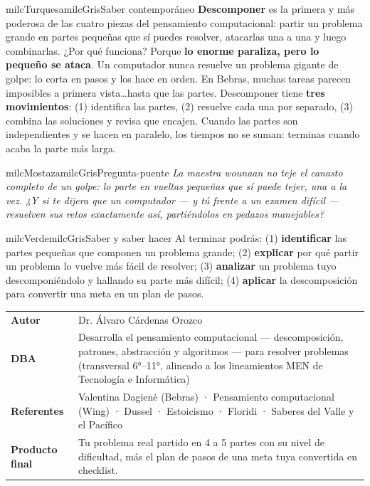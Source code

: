 \documentclass[11pt,letterpaper]{article}
\begin{document}
\begin{softbox}{milcTurquesa}{milcGris}{Saber contemporáneo}
\textbf{Descomponer} es la primera y más poderosa de las cuatro piezas del pensamiento computacional: partir un problema grande en partes pequeñas que sí puedes resolver, atacarlas una a una y luego combinarlas. ¿Por qué funciona? Porque \textbf{lo enorme paraliza, pero lo pequeño se ataca}. Un computador nunca resuelve un problema gigante de golpe: lo corta en pasos y los hace en orden. En Bebras, muchas tareas parecen imposibles a primera vista\ldots hasta que las partes. Descomponer tiene \textbf{tres movimientos}: (1) identifica las partes, (2) resuelve cada una por separado, (3) combina las soluciones y revisa que encajen. Cuando las partes son independientes y se hacen en paralelo, los tiempos no se suman: terminas cuando acaba la parte más larga.
\end{softbox}

\begin{softbox}{milcMostaza}{milcGris}{Pregunta-puente}
\textit{La maestra wounaan no teje el canasto completo de un golpe: lo parte en vueltas pequeñas que sí puede tejer, una a la vez. ¿Y si te dijera que un computador --- y tú frente a un examen difícil --- resuelven sus retos exactamente así, partiéndolos en pedazos manejables?}
\end{softbox}

\begin{softbox}{milcVerde}{milcGris}{Saber y saber hacer}
Al terminar podrás: (1) \textbf{identificar} las partes pequeñas que componen un problema grande; (2) \textbf{explicar} por qué partir un problema lo vuelve más fácil de resolver; (3) \textbf{analizar} un problema tuyo descomponiéndolo y hallando su parte más difícil; (4) \textbf{aplicar} la descomposición para convertir una meta en un plan de pasos.
\end{softbox}



\small
\begin{tabularx}{\textwidth}{>{\bfseries}p{3.0cm}Y}
Autor & Dr. Álvaro Cárdenas Orozco\\
DBA & Desarrolla el pensamiento computacional --- descomposición, patrones, abstracción y algoritmos --- para resolver problemas (transversal 6°--11°, alineado a los lineamientos MEN de Tecnología e Informática)\\
Referentes & Valentina Dagienė (Bebras) · Pensamiento computacional (Wing) · Dussel · Estoicismo · Floridi · Saberes del Valle y el Pacífico\\
Producto final & Tu problema real partido en 4 a 5 partes con su nivel de dificultad, más el plan de pasos de una meta tuya convertida en checklist.\\
\end{tabularx}
\normalsize
\end{document}

